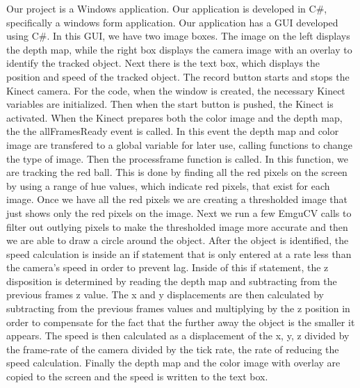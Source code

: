 \documentclass[onecolumn, draftclsnofoot,10pt, compsoc]{IEEEtran}
\begin{document}
Our project is a Windows application.
Our application is developed in C\#, specifically a windows form application.
Our application has a GUI developed using C\#.
In this GUI, we have two image boxes.
The image on the left displays the depth map, while the right box displays the camera image with an overlay to identify the tracked object.
Next there is the text box, which displays the position and speed of the tracked object.
The record button starts and stops the Kinect camera.
For the code, when the window is created, the necessary Kinect variables are initialized.
Then when the start button is pushed, the Kinect is activated.
When the Kinect prepares both the color image and the depth map, the the allFramesReady event is called.
In this event the depth map and color image are transfered to a global variable for later use, calling functions to change the type of image.
Then the processframe function is called.
In this function, we are tracking the red ball.
This is done by finding all the red pixels on the screen by using a range of hue values, which indicate red pixels, that exist for each image.
Once we have all the red pixels we are creating a thresholded image that just shows only the red pixels on the image.
Next we run a few EmguCV calls to filter out outlying pixels to make the thresholded image more accurate and then we are able to draw a circle around the object.
After the object is identified, the speed calculation is inside an if statement that is only entered at a rate less than the camera's speed in order to prevent lag.
Inside of this if statement, the z disposition is determined by reading the depth map and subtracting from the previous frames z value.
The x and y displacements are then calculated by subtracting from the previous frames values and multiplying by the z position in order to compensate for the fact that the further away the object is the smaller it appears.
The speed is then calculated as a displacement of the x, y, z divided by the frame-rate of the camera divided by the tick rate, the rate of reducing the speed calculation.
Finally the depth map and the color image with overlay are copied to the screen and the speed is written to the text box.
\end{document}
